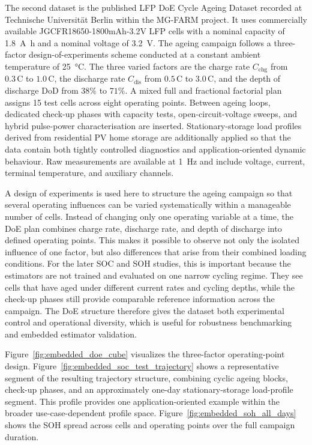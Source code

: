 \documentclass[
    a4paper,
    12pt,
    titlepage,
    bibliography=totoc,
    twoside=on,
    parskip=false,
    numbers=noenddot,
    cleardoublepage=empty,
    DIV=12,
    BCOR=12.0mm,
    headheight=36pt,
    headings=openright
]{scrreprt}
\begin{document}
The second dataset is the published LFP DoE Cycle Ageing Dataset recorded at Technische Universit\"at Berlin within the MG-FARM project.\autocite{lfpDoeCycleAgingDataset2025} It uses commercially available JGCFR18650-1800mAh-3.2V LFP cells with a nominal capacity of \SI{1.8}{\ampere\hour} and a nominal voltage of \SI{3.2}{\volt}. The ageing campaign follows a three-factor design-of-experiments scheme conducted at a constant ambient temperature of \SI{25}{\celsius}. The three varied factors are the charge rate $C_\mathrm{chg}$ from $0.3\,\mathrm{C}$ to $1.0\,\mathrm{C}$, the discharge rate $C_\mathrm{dis}$ from $0.5\,\mathrm{C}$ to $3.0\,\mathrm{C}$, and the depth of discharge $\mathrm{DoD}$ from $38\%$ to $71\%$. A mixed full and fractional factorial plan assigns 15 test cells across eight operating points. Between ageing loops, dedicated check-up phases with capacity tests, open-circuit-voltage sweeps, and hybrid pulse-power characterisation are inserted. Stationary-storage load profiles derived from residential PV home storage are additionally applied so that the data contain both tightly controlled diagnostics and application-oriented dynamic behaviour. Raw measurements are available at \SI{1}{\hertz} and include voltage, current, terminal temperature, and auxiliary channels.

A design of experiments is used here to structure the ageing campaign so that several operating influences can be varied systematically within a manageable number of cells.\autocite{siebertzStatistischeVersuchsplanung2017} Instead of changing only one operating variable at a time, the DoE plan combines charge rate, discharge rate, and depth of discharge into defined operating points. This makes it possible to observe not only the isolated influence of one factor, but also differences that arise from their combined loading conditions. For the later SOC and SOH studies, this is important because the estimators are not trained and evaluated on one narrow cycling regime. They see cells that have aged under different current rates and cycling depths, while the check-up phases still provide comparable reference information across the campaign. The DoE structure therefore gives the dataset both experimental control and operational diversity, which is useful for robustness benchmarking and embedded estimator validation.

Figure~\ref{fig:embedded_doe_cube} visualizes the three-factor operating-point design. Figure~\ref{fig:embedded_soc_test_trajectory} shows a representative segment of the resulting trajectory structure, combining cyclic ageing blocks, check-up phases, and an approximately one-day stationary-storage load-profile segment. This profile provides one application-oriented example within the broader use-case-dependent profile space. Figure~\ref{fig:embedded_soh_all_days} shows the SOH spread across cells and operating points over the full campaign duration.
\end{document}
